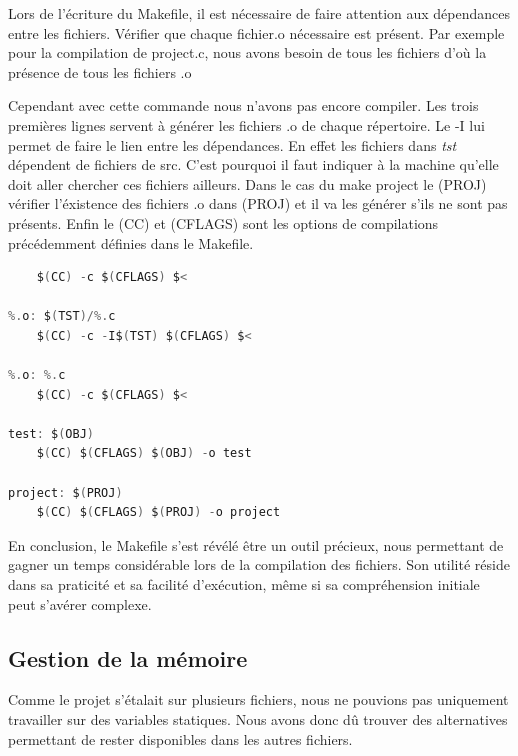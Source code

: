 \documentclass{article}
\begin{document}
\vspace{1em} Lors de l'écriture du Makefile, il est nécessaire de faire attention aux dépendances entre les fichiers. Vérifier que chaque fichier.o nécessaire est présent. Par exemple pour la compilation de  project.c, nous avons besoin de tous les fichiers d'où la présence de tous les fichiers .o 


\vspace{1em} Cependant avec cette commande nous n'avons pas encore compiler. Les trois premières lignes servent à générer les fichiers .o de chaque répertoire. Le -I lui permet de faire le lien entre les dépendances. En effet les fichiers dans \emph{tst} dépendent de fichiers de src. C'est  pourquoi il faut indiquer à la machine qu'elle doit aller chercher ces fichiers ailleurs. Dans le cas du make project le \textdollar(PROJ) vérifier l'éxistence des fichiers .o dans \textdollar(PROJ) et il va les générer s'ils ne sont pas présents. Enfin le \textdollar(CC) et \textdollar(CFLAGS) sont les options de compilations précédemment définies dans le Makefile.

\begin{tcolorbox}[colback=gray!10,colframe=white!75!black]
\begin{lstlisting}[language=C, caption={Commande de compilation}, label={lst:exemple1-c}]
%.o: $(SRC)/%.c
	$(CC) -c $(CFLAGS) $<

%.o: $(TST)/%.c
	$(CC) -c -I$(TST) $(CFLAGS) $<

%.o: %.c
	$(CC) -c $(CFLAGS) $<

test: $(OBJ)
	$(CC) $(CFLAGS) $(OBJ) -o test

project: $(PROJ)
	$(CC) $(CFLAGS) $(PROJ) -o project

\end{lstlisting}
\end{tcolorbox}
\vspace{1em} En conclusion, le Makefile s'est révélé être un outil précieux, nous permettant de gagner un temps considérable lors de la compilation des fichiers. Son utilité réside dans sa praticité et sa facilité d'exécution, même si sa compréhension initiale peut s'avérer complexe.

\subsection{Gestion de la mémoire}

\hspace{1em} Comme le projet s'étalait sur plusieurs fichiers, nous ne pouvions pas uniquement travailler sur des variables statiques. Nous avons donc dû trouver des alternatives permettant de rester disponibles dans les autres fichiers. 
\end{document}
